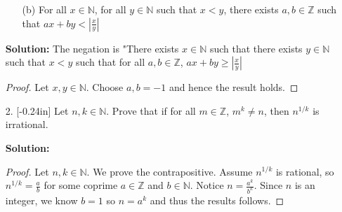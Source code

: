 \documentclass[letterpaper,12pt]{article}
\theoremstyle{definition}
\begin{document}
\begin{enumerate}
    \item[] \begin{enumerate}
        \item[(b)] For all $x \in \mathbb{N}$, for all $y \in \mathbb{N}$ such that $x< y$, there exists $a,b \in \mathbb{Z}$ such that $ax + by < \left | \frac{x}{y} \right |$
    \end{enumerate}
     \begin{mdframed}
            \textbf{Solution:}
            The negation is "There exists $x \in \mathbb{N}$ such that there exists $y \in \mathbb{N}$ such that $x < y$ such that for all $a,b \in \mathbb{Z}$, $ax + by \geq \left | \frac{x}{y} \right |$
            \begin{proof}
                Let $x,y \in \mathbb{N}$. Choose $a,b = -1$ and hence the result holds.
            \end{proof}
        \end{mdframed}
\end{enumerate}
\pagebreak
\begin{enumerate}
    \item[2. ]\reversemarginpar{}[-0.24in] Let $n,k \in \mathbb{N}$. Prove that if for all $m \in \mathbb{Z}$, $m^k \neq n$, then $n^{1/k}$ is irrational.
     \begin{mdframed}
            \textbf{Solution:}
            \begin{proof}
                Let $n,k \in \mathbb{N}$. We prove the contrapositive. Assume $n^{1/k}$ is rational, so $n^{1/k} = \frac{a}{b}$ for some coprime $a \in \mathbb{Z}$ and $b \in \mathbb{N}$. Notice $n = \frac{a^k}{b^k}$. Since $n$ is an integer, we know $b = 1$ so $n = a^k$ and thus the results follows.
            \end{proof}
        \end{mdframed}
\end{enumerate}
\pagebreak
\end{document}
